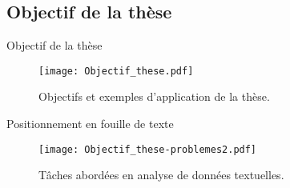 \subsection{Objectif de la thèse}
\begin{frame}[c]{Objectif de la thèse}
	\begin{figure}[!htb]	
		\texttt{[image: Objectif\_these.pdf]}
		\caption{Objectifs et exemples d'application de la thèse.} \label{fig:intro:objectif-these}
	\end{figure}
\end{frame}

\begin{frame}[c]{Positionnement en fouille de texte}	
	\begin{figure}[!htb]
		\texttt{[image: Objectif\_these-problemes2.pdf]}
		\caption{Tâches abordées en analyse de données textuelles.} \label{fig:intro:objectif-these-problemes}
	\end{figure}
\end{frame}

